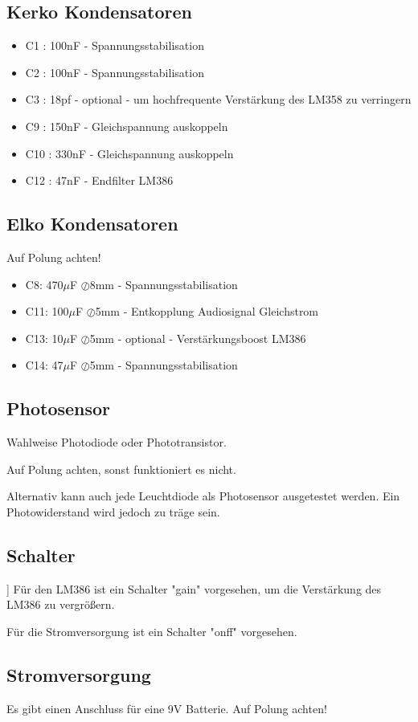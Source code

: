 \documentclass[]{article}
\begin{document}
\subsection{Kerko Kondensatoren}
\begin{itemize}
	\item C1 : 100nF - Spannungsstabilisation
	\item C2 : 100nF - Spannungsstabilisation
	\item C3 : 18pf - optional - um hochfrequente Verstärkung des LM358 zu verringern
	\item C9 : 150nF - Gleichspannung auskoppeln
	\item C10 : 330nF - Gleichspannung auskoppeln
	\item C12 : 47nF - Endfilter LM386	
\end{itemize}
\subsection{Elko Kondensatoren}
Auf Polung achten!
\begin{itemize}
	\item C8: 470$\mu$F $\oslash$8mm - Spannungsstabilisation
	\item C11: 100$\mu$F $\oslash$5mm - Entkopplung Audiosignal Gleichstrom
	\item C13: 10$\mu$F $\oslash$5mm - optional - Verstärkungsboost LM386
	\item C14: 47$\mu$F  $\oslash$5mm - Spannungsstabilisation
\end{itemize}
\subsection{Photosensor}
Wahlweise Photodiode oder Phototransistor.

Auf Polung achten, sonst funktioniert es nicht.

Alternativ kann auch jede Leuchtdiode als Photosensor ausgetestet werden. Ein Photowiderstand wird jedoch zu träge sein.
\subsection{Schalter}]
Für den LM386 ist ein Schalter "gain" vorgesehen, um die Verstärkung des LM386 zu vergrößern.

Für die Stromversorgung ist ein Schalter "onff" vorgesehen.

\subsection{Stromversorgung}
Es gibt einen Anschluss für eine 9V Batterie. Auf Polung achten!
\end{document}
